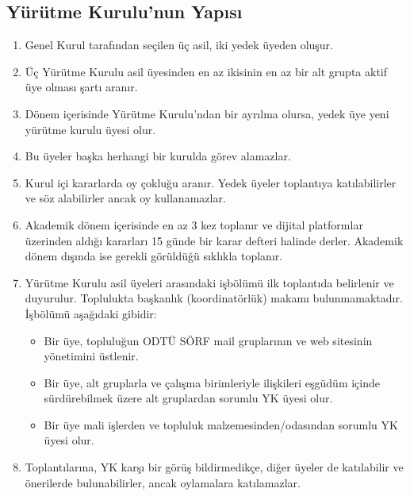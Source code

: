 \documentclass[11pt,a4paper]{article}
\begin{document}
\subsection{Yürütme Kurulu'nun Yapısı}
\begin{enumerate}
    \item Genel Kurul tarafından seçilen üç asil, iki yedek üyeden oluşur.
    \item Üç Yürütme Kurulu asil üyesinden en az ikisinin en az bir alt grupta aktif üye olması şartı aranır.
    \item Dönem içerisinde Yürütme Kurulu’ndan bir ayrılma olursa, yedek üye yeni yürütme kurulu üyesi olur.
    \item Bu üyeler başka herhangi bir kurulda görev alamazlar.
    \item Kurul içi kararlarda oy çokluğu aranır. Yedek üyeler toplantıya katılabilirler ve söz alabilirler ancak oy kullanamazlar.
    \item Akademik dönem içerisinde en az 3 kez toplanır ve dijital platformlar üzerinden aldığı kararları 15 günde bir karar defteri halinde derler. Akademik dönem dışında ise gerekli görüldüğü sıklıkla toplanır.
    \item Yürütme Kurulu asil üyeleri arasındaki işbölümü ilk toplantıda belirlenir ve duyurulur. Toplulukta başkanlık (koordinatörlük) makamı bulunmamaktadır. İşbölümü aşağıdaki gibidir:
    \begin{itemize}
        \item Bir üye, topluluğun ODTÜ SÖRF mail gruplarının ve web sitesinin yönetimini üstlenir.
        \item Bir üye, alt gruplarla ve çalışma birimleriyle ilişkileri eşgüdüm içinde sürdürebilmek üzere alt gruplardan sorumlu YK üyesi olur.
        \item Bir üye mali işlerden ve topluluk malzemesinden/odasından sorumlu YK üyesi olur.
    \end{itemize}
    \item Toplantılarına, YK karşı bir görüş bildirmedikçe, diğer üyeler de katılabilir ve önerilerde bulunabilirler, ancak oylamalara katılamazlar.
\end{enumerate}
\end{document}
